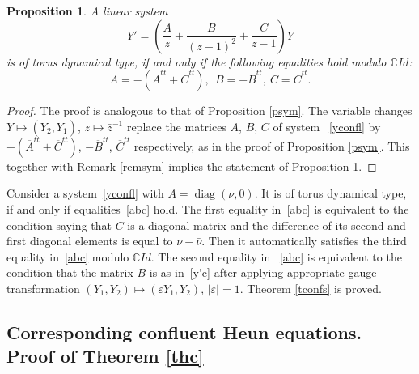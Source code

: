 \documentclass[preprint,12pt]{elsarticle}
\theoremstyle{plain}
\newtheorem{proposition}[theorem]{Proposition}
\DeclareMathOperator{\diag}{\mathrm{diag}}
\numberwithin{equation}{section}
\numberwithin{equation}{section}
\begin{document}
\begin{proposition} \label{pcsym} A linear system 
\begin{equation}Y'=\left(\frac Az+\frac B{(z-1)^2}+\frac C{z-1}\right)Y\label{yconfl}\end{equation}
is of torus dynamical type, if and only if the following equalities hold modulo $\mathbb{C} Id$:
\begin{equation}A=-(\overline A^{tt}+\overline C^{tt}), \ \ B=-\overline B^{tt}, \ C=\overline C^{tt}.\label{abc}\end{equation}
\end{proposition}
\begin{proof} The proof is analogous to that of Proposition \ref{psym}. The variable changes 
 $Y\mapsto (\overline Y_2,\overline Y_1)$, $z\mapsto\bar z^{-1}$ replace the matrices $A$, $B$, $C$ of system 
~\eqref{yconfl} by $-(\overline A^{tt}+\overline C^{tt})$, $-\overline B^{tt}$, $\overline C^{tt}$ respectively, 
 as in the proof of Proposition \ref{psym}. This together with Remark \ref{remsym} implies the statement of Proposition \ref{pcsym}.
 \end{proof}
 
Consider a system~\eqref{yconfl} with $A=\diag(\nu,0)$. It is  of torus dynamical type, if and only if equalities~\eqref{abc} hold. The first equality in~\eqref{abc} is equivalent to the condition saying that $C$ is a diagonal matrix and the difference of its second and first diagonal elements is equal to $\nu-\bar\nu$. Then it automatically satisfies the third equality in~\eqref{abc} modulo $\mathbb{C} Id$. The second equality in 
~\eqref{abc} is equivalent to the condition that the matrix $B$ is as in~\eqref{y'c} after applying appropriate gauge transformation $(Y_1,Y_2)\mapsto(\varepsilon Y_1, Y_2)$, $|\varepsilon|=1$. Theorem \ref{tconfs} is proved.

\subsection{Corresponding confluent Heun equations. Proof of Theorem \ref{thc}}
\end{document}

